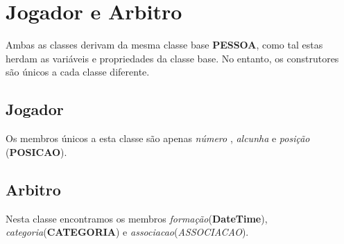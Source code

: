 \section{Jogador e Arbitro}
Ambas as classes derivam da mesma classe base \textbf{PESSOA}, como tal estas herdam as variáveis e 
propriedades da classe base. No entanto, os construtores são únicos a cada classe diferente.
\subsection{Jogador}
Os membros únicos a esta classe são apenas \textit{número} , \textit{alcunha} e \textit{posição} (\textbf{POSICAO}).\\
\subsection{Arbitro}
Nesta classe encontramos os membros \textit{formação}(\textbf{DateTime}), \textit{categoria}(\textbf{CATEGORIA}) e \textit{associacao}(\textit{ASSOCIACAO}).